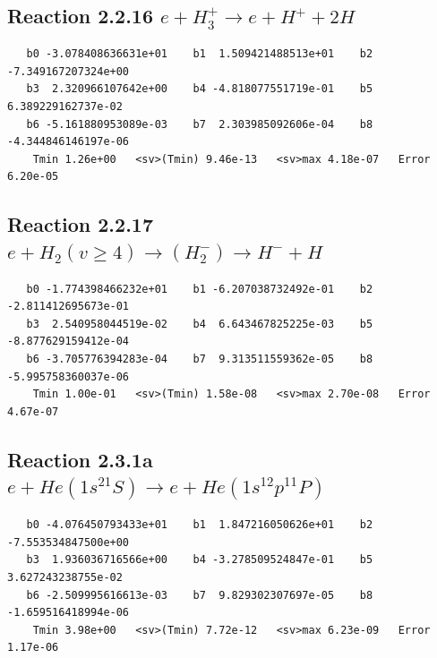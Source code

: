 \documentclass[12pt,dvipdfmx]{article}
\begin{document}
\newpage
\subsection{
Reaction 2.2.16 $  e + H_3^+ \rightarrow e + H^+ + 2H$}


\begin{small}\begin{verbatim}
   b0 -3.078408636631e+01    b1  1.509421488513e+01    b2 -7.349167207324e+00
   b3  2.320966107642e+00    b4 -4.818077551719e-01    b5  6.389229162737e-02
   b6 -5.161880953089e-03    b7  2.303985092606e-04    b8 -4.344846146197e-06
    Tmin 1.26e+00   <sv>(Tmin) 9.46e-13   <sv>max 4.18e-07   Error 6.20e-05
\end{verbatim}\end{small}

\newpage
\subsection{
Reaction 2.2.17 $  e + H_2(v \geq 4) \rightarrow (H_2^-) \rightarrow H^- + H$}


\begin{small}\begin{verbatim}
   b0 -1.774398466232e+01    b1 -6.207038732492e-01    b2 -2.811412695673e-01
   b3  2.540958044519e-02    b4  6.643467825225e-03    b5 -8.877629159412e-04
   b6 -3.705776394283e-04    b7  9.313511559362e-05    b8 -5.995758360037e-06
    Tmin 1.00e-01   <sv>(Tmin) 1.58e-08   <sv>max 2.70e-08   Error 4.67e-07
\end{verbatim}\end{small}

\newpage
\subsection{
Reaction 2.3.1a $e + He(1s^21S) \rightarrow e + He(1s^12p^11P)$}















\begin{small}\begin{verbatim}
   b0 -4.076450793433e+01    b1  1.847216050626e+01    b2 -7.553534847500e+00
   b3  1.936036716566e+00    b4 -3.278509524847e-01    b5  3.627243238755e-02
   b6 -2.509995616613e-03    b7  9.829302307697e-05    b8 -1.659516418994e-06
    Tmin 3.98e+00   <sv>(Tmin) 7.72e-12   <sv>max 6.23e-09   Error 1.17e-06
\end{verbatim}\end{small}
\end{document}
